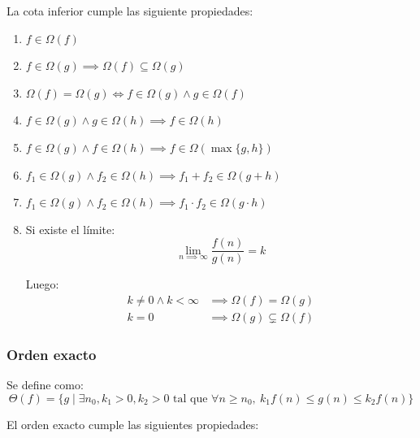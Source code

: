 \documentclass{article}
\newcommand{\BigOmega}[1]{{\Omega(#1)}}
\newcommand{\BigTheta}[1]{{\Theta(#1)}}
\begin{document}
La cota inferior cumple las siguiente propiedades:
\begin{enumerate}
    \item $f \in \BigOmega{f}$
    \item $f \in \BigOmega{g} \implies \BigOmega{f} \subseteq \BigOmega{g}$
    \item $\BigOmega{f} = \BigOmega{g} \iff f \in \BigOmega{g} \land g \in \BigOmega{f}$
    \item $f \in \BigOmega{g} \land g \in \BigOmega{h} \implies f \in \BigOmega{h}$
    \item $f \in \BigOmega{g} \land f \in \BigOmega{h} \implies f \in \BigOmega{\max{\{g, h\}}}$
    \item $f_1 \in \BigOmega{g} \land f_2 \in \BigOmega{h} \implies f_1 + f_2 \in \BigOmega{g + h}$
    \item $f_1 \in \BigOmega{g} \land f_2 \in \BigOmega{h} \implies f_1 \cdot f_2 \in \BigOmega{g \cdot h}$
    \item Si existe el límite:
          $$\lim_{n \implies \infty} \frac{f(n)}{g(n)} = k$$

          Luego:
          \begin{align*}
              k \neq 0 \land k < \infty & \implies \BigOmega{f} = \BigOmega{g}          \\
              k = 0                     & \implies \BigOmega{g} \subsetneq \BigOmega{f}
          \end{align*}
\end{enumerate}

\subsubsection{Orden exacto}

Se define como:
$$\BigTheta{f} = \{ g \mid \exists n_0, k_1 > 0, k_2 > 0 \text{ tal que } \forall n \geq n_0,\ k_1 f(n) \leq g(n) \leq k_2 f(n) \}$$

El orden exacto cumple las siguientes propiedades:
\end{document}
